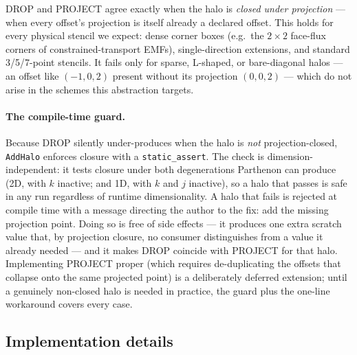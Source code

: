 \documentclass[11pt]{article}
\newcommand{\code}[1]{\lstinline[basicstyle=\ttfamily]|#1|}
\begin{document}
DROP and PROJECT agree exactly when the halo is \emph{closed under projection} ---
when every offset's projection is itself already a declared offset. This holds for
every physical stencil we expect: dense corner boxes (e.g.\ the $2\times2$ face-flux
corners of constrained-transport EMFs), single-direction extensions, and standard
3/5/7-point stencils. It fails only for sparse, L-shaped, or bare-diagonal halos ---
an offset like $(-1,0,2)$ present without its projection $(0,0,2)$ --- which do not
arise in the schemes this abstraction targets.

\paragraph{The compile-time guard.} Because DROP silently under-produces when the
halo is \emph{not} projection-closed, \code{AddHalo} enforces closure with a
\code{static_assert}. The check is dimension-independent: it tests closure under
both degenerations Parthenon can produce (2D, with $k$ inactive; and 1D, with $k$
and $j$ inactive), so a halo that passes is safe in any run regardless of runtime
dimensionality. A halo that fails is rejected at compile time with a message
directing the author to the fix: add the missing projection point. Doing so is
free of side effects --- it produces one extra scratch value that, by projection
closure, no consumer distinguishes from a value it already needed --- and it makes
DROP coincide with PROJECT for that halo. Implementing PROJECT proper (which
requires de-duplicating the offsets that collapse onto the same projected point) is
a deliberately deferred extension; until a genuinely non-closed halo is needed in
practice, the guard plus the one-line workaround covers every case.

\subsection{Implementation details}
\label{sec:halo-impl}
\end{document}
